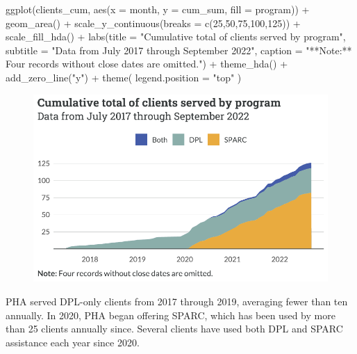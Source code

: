 \documentclass[
  letterpaper,
  DIV=11,
  numbers=noendperiod]{scrartcl}
\newenvironment{Shaded}{\begin{snugshade}}{\end{snugshade}}
\newcommand{\AttributeTok}[1]{\textcolor[rgb]{0.40,0.45,0.13}{#1}}
\newcommand{\DecValTok}[1]{\textcolor[rgb]{0.68,0.00,0.00}{#1}}
\newcommand{\FunctionTok}[1]{\textcolor[rgb]{0.28,0.35,0.67}{#1}}
\newcommand{\NormalTok}[1]{\textcolor[rgb]{0.00,0.23,0.31}{#1}}
\newcommand{\SpecialCharTok}[1]{\textcolor[rgb]{0.37,0.37,0.37}{#1}}
\newcommand{\StringTok}[1]{\textcolor[rgb]{0.13,0.47,0.30}{#1}}
\begin{document}
\begin{Shaded}
\begin{Highlighting}[]
\FunctionTok{ggplot}\NormalTok{(clients\_cum, }\FunctionTok{aes}\NormalTok{(}\AttributeTok{x =}\NormalTok{ month, }\AttributeTok{y =}\NormalTok{ cum\_sum, }\AttributeTok{fill =}\NormalTok{ program)) }\SpecialCharTok{+}
  \FunctionTok{geom\_area}\NormalTok{() }\SpecialCharTok{+}
  \FunctionTok{scale\_y\_continuous}\NormalTok{(}\AttributeTok{breaks =} \FunctionTok{c}\NormalTok{(}\DecValTok{25}\NormalTok{,}\DecValTok{50}\NormalTok{,}\DecValTok{75}\NormalTok{,}\DecValTok{100}\NormalTok{,}\DecValTok{125}\NormalTok{)) }\SpecialCharTok{+}
  \FunctionTok{scale\_fill\_hda}\NormalTok{() }\SpecialCharTok{+}
  \FunctionTok{labs}\NormalTok{(}\AttributeTok{title =} \StringTok{"Cumulative total of clients served by program"}\NormalTok{,}
       \AttributeTok{subtitle =} \StringTok{"Data from July 2017 through September 2022"}\NormalTok{,}
       \AttributeTok{caption =} \StringTok{"**Note:** Four records without close dates are omitted."}\NormalTok{) }\SpecialCharTok{+}
  \FunctionTok{theme\_hda}\NormalTok{() }\SpecialCharTok{+}
  \FunctionTok{add\_zero\_line}\NormalTok{(}\StringTok{"y"}\NormalTok{) }\SpecialCharTok{+}
  \FunctionTok{theme}\NormalTok{(}
    \AttributeTok{legend.position =} \StringTok{"top"}
\NormalTok{  )}
\end{Highlighting}
\end{Shaded}

\begin{figure}[H]

{\centering \includegraphics{piedmont_files/figure-pdf/cumulative-1.pdf}

}

\end{figure}

PHA served DPL-only clients from 2017 through 2019, averaging fewer than
ten annually. In 2020, PHA began offering SPARC, which has been used by
more than 25 clients annually since. Several clients have used both DPL
and SPARC assistance each year since 2020.
\end{document}
